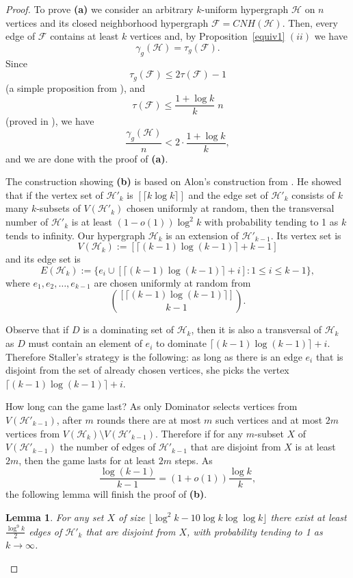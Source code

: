 \documentclass[12pt]{article}
\newtheorem{lemma}[theorem]{Lemma}
\newcommand\cF{{\mathcal F}}
\newcommand\cH{{\mathcal H}}
\begin{document}
\begin{proof}
To prove \textbf{(a)} we consider an arbitrary $k$-uniform hypergraph $\cH$ on $n$ vertices and its closed neighborhood hypergraph $\cF=CNH(\cH)$. Then, every edge of $\cF$ contains at least $k$ vertices and, by Proposition~\ref{equiv1} $(ii)$ we have $$\gamma_g(\cH)=\tau_g(\cF).$$ Since  $$\tau_g(\cF) \le 2\tau(\cF)-1$$ (a simple proposition from \cite{BHT2}), and $$\tau(\cF)\le \frac{1+\log k}{k}\;n$$ (proved in \cite{Alon}), we have $$\frac{\gamma_g(\cH)}{n}<2\cdot\frac{1+\log k}{k},$$
and we are done with the proof of \textbf{(a)}.

The construction showing \textbf{(b)} is based on Alon's construction from \cite{Alon}. He showed that if the vertex set of $\cH'_k$ is $[\lceil k\log k\rceil]$ and the edge set of $\cH'_k$ consists of $k$ many $k$-subsets of $V(\cH'_k)$ chosen uniformly at random, then the transversal number of $\cH'_k$ is at least $(1-o(1))\log^2k$ with probability tending to 1 as $k$ tends to infinity. Our hypergraph $\cH_k$ is an extension of $\cH'_{k-1}$. Its vertex set is $$V(\cH_k):=[\lceil (k-1)\log (k-1)\rceil+k-1]$$ and its edge set is $$E(\cH_k):=\{e_i \cup[\lceil (k-1)\log (k-1)\rceil+i]:1\le i\le k-1 \},$$ where $e_1,e_2,\dots, e_{k-1}$ are chosen uniformly at random from $$\binom{[\lceil (k-1)\log (k-1)\rceil]}{k-1}.$$

Observe that if $D$ is a dominating set of $\cH_k$, then it is also a transversal of $\cH_k$ as $D$ must contain an element of $e_i$ to dominate $\lceil (k-1)\log (k-1)\rceil+i$.
Therefore Staller's strategy is the following: as long as there is an edge $e_i$ that is disjoint from the set of already chosen vertices, she picks the vertex $\lceil (k-1)\log (k-1)\rceil+i$. 

How long can the game last? As only Dominator selects vertices from $V(\cH'_{k-1})$, after $m$ rounds there are at most $m$ such vertices and at most $2m$ vertices from $V(\cH_k)\setminus V(\cH'_{k-1})$. Therefore if for any $m$-subset $X$ of $V(\cH'_{k-1})$ the number of edges of $\cH'_{k-1}$ that are disjoint from $X$ is at least $2m$, then the game lasts for at least $2m$ steps. As $$\frac{\log (k-1)}{k-1}=(1+o(1))\frac{\log k}{k},$$ the following lemma will finish the proof of \textbf{(b)}.

\begin{lemma}
For any set $X$ of size $\lfloor\log^2k-10\log k\log\log k\rfloor$ there exist at least $\frac{\log^9k}{2}$ edges of $\cH'_k$ that are disjoint from $X$, with probability tending to 1 as $k\to\infty$.
\end{lemma}


\end{proof}
\end{document}
